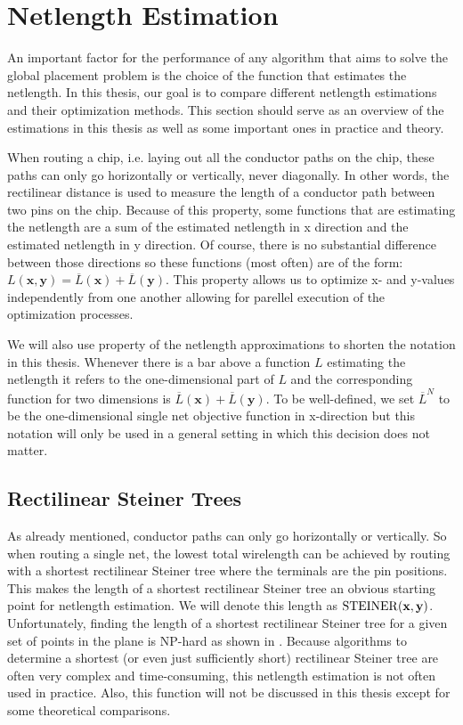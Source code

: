 \section{Netlength Estimation} \label{sec:netlength_estimation}

An important factor for the performance of any algorithm that aims to solve the global placement problem is the choice of the function that estimates the netlength.
In this thesis, our goal is to compare different netlength estimations and their optimization methods.
This section should serve as an overview of the estimations in this thesis as well as some important ones in practice and theory.

When routing a chip, i.e. laying out all the conductor paths on the chip, these paths can only go horizontally or vertically, never diagonally.
In other words, the rectilinear distance is used to measure the length of a conductor path between two pins on the chip.
Because of this property, some functions that are estimating the netlength are a sum of the estimated netlength in x direction
and the estimated netlength in y direction.
Of course, there is no substantial difference between those directions so these functions (most often) are of the form:
\( L(\mathbf{x}, \mathbf{y}) = \overline{L}(\mathbf{x}) + \overline{L}(\mathbf{y}) \).
This property allows us to optimize x- and y-values independently from one another allowing for parellel execution of the optimization processes.

We will also use property of the netlength approximations to shorten the notation in this thesis. 
Whenever there is a bar above a function \(L\) estimating the netlength it refers to the one-dimensional part of \(L\)
and the corresponding function for two dimensions is \(\overline{L}(\mathbf{x}) + \overline{L}(\mathbf{y})\).
To be well-defined, we set \(\overline{L}^N\) to be the one-dimensional single net objective function in x-direction
but this notation will only be used in a general setting in which this decision does not matter.

\subsection{Rectilinear Steiner Trees} \label{subsec:rectilinear_steiner_trees}
As already mentioned, conductor paths can only go horizontally or vertically.
So when routing a single net, the lowest total wirelength can be achieved by routing with a shortest rectilinear Steiner tree
where the terminals are the pin positions.
This makes the length of a shortest rectilinear Steiner tree an obvious starting point for netlength estimation.
We will denote this length as \(\operatorname{STEINER}(\mathbf{x}, \mathbf{y})\).
Unfortunately, finding the length of a shortest rectilinear Steiner tree for a given set of points in the plane is NP-hard as shown in \cite{GareyJohnson-RectilinearSteinerTree}.
Because algorithms to determine a shortest (or even just sufficiently short) rectilinear Steiner tree are often very complex and time-consuming,
this netlength estimation is not often used in practice.
Also, this function will not be discussed in this thesis except for some theoretical comparisons.


